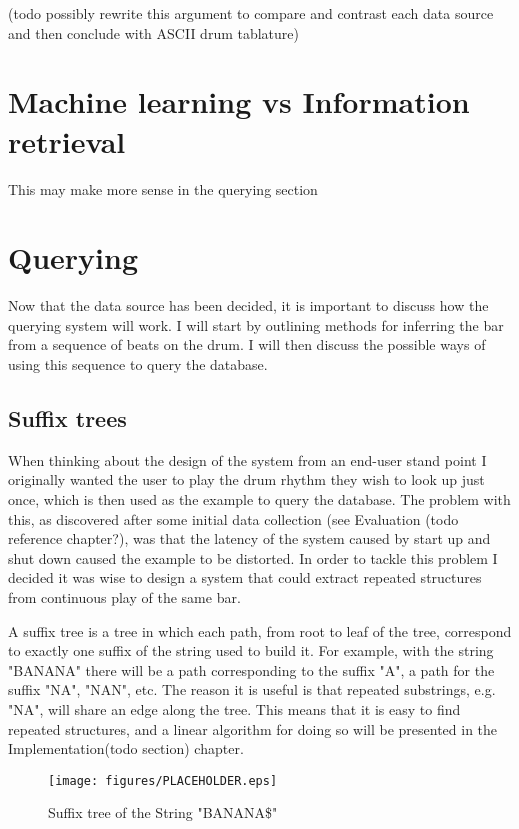 \documentclass[12pt,twoside,notitlepage]{report}
\begin{document}
		(todo possibly rewrite this argument to compare and contrast each data source and then conclude with ASCII drum tablature)
		
		
		
	\section{Machine learning vs Information retrieval}
	This may make more sense in the querying section
	\section{Querying}
	Now that the data source has been decided, it is important to discuss how the querying system will work. I will start by outlining methods for inferring the bar from a sequence of beats on the drum. I will then discuss the possible ways of using this sequence to query the database.
	

		\subsection{Suffix trees}
		
		When thinking about the design of the system from an end-user stand point I originally wanted the user to play the drum rhythm they wish to look up just once, which is then used as the example to query the database. The problem with this, as discovered after some initial data collection (see Evaluation (todo reference chapter?), was that the latency of the system caused by start up and shut down caused the example to be distorted. In order to tackle this problem I decided it was wise to design a system that could extract repeated structures from continuous play of the same bar.
		
		A suffix tree\cite{Weiner1973} is a tree in which each path, from root to leaf of the tree, correspond to exactly one suffix of the string used to build it. For example, with the string "BANANA" there will be a path corresponding to the suffix "A", a path for the suffix "NA", "NAN", etc. The reason it is useful is that repeated substrings, e.g. "NA", will share an edge along the tree. This means that it is easy to find repeated structures, and a linear algorithm\cite{Gusfield1999} for doing so will be presented in the Implementation(todo section) chapter.		
\begin{figure}[h]
			\centerline{\texttt{[image: figures/PLACEHOLDER.eps]}}
			\caption{\label{SuffixTree} Suffix tree of the String "BANANA\$"}
\end{figure}
		
\end{document}
